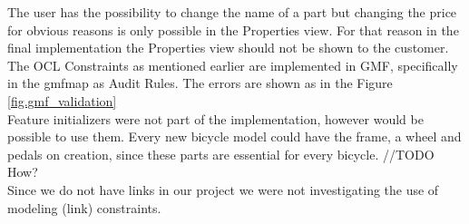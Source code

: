 \noindent The user has the possibility to change the name of a part but changing 
the price for obvious reasons is only possible in the Properties view. 
For that reason in the final implementation the Properties view should 
not be shown to the customer. The OCL Constraints as mentioned earlier 
are implemented in GMF, specifically in the gmfmap as Audit Rules.
The errors are shown as in the Figure \ref{fig.gmf_validation}\\

\noindent Feature initializers were not part of the implementation, however
would be possible to use them. Every new bicycle model could have the
frame, a wheel and pedals on creation, since these parts are essential for every
bicycle. //TODO How?\\

\noindent Since we do not have links in our project we were not investigating
the use of modeling (link) constraints.\\
